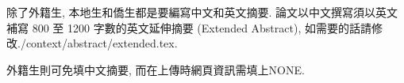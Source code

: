 \StartAbstractChi

除了外籍生, 本地生和僑生都是要編寫中文和英文摘要. 論文以中文撰寫須以英文補寫 800 至 1200 字數的英文延伸摘要 (Extended Abstract), 如需要的話請修改\textprimstress./context/abstract/extended.tex\textprimstress.

外籍生則可免填中文摘要, 而在上傳時網頁資訊需填上\textprimstress NONE\textprimstress.\\

\EndAbstractChi
